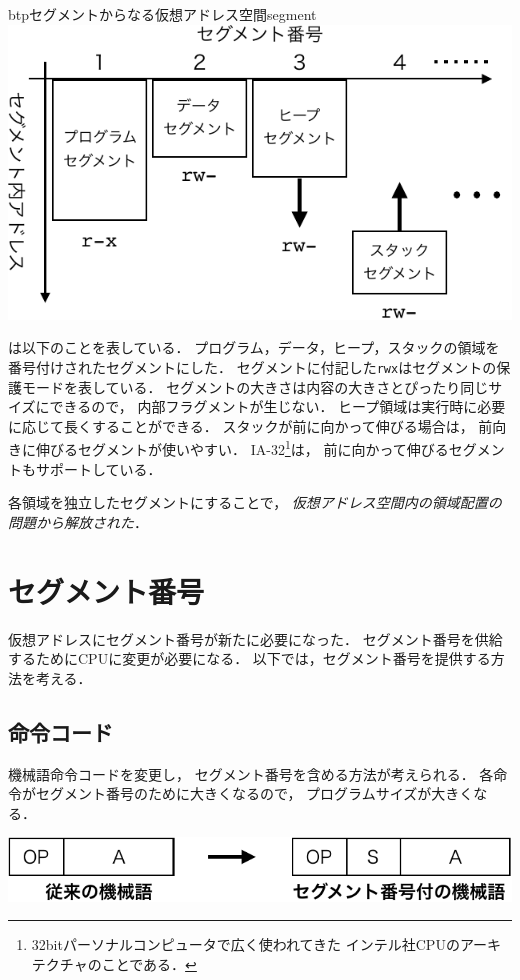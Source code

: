 \begin{myfig}{btp}{セグメントからなる仮想アドレス空間}{segment}
  \includegraphics[scale=0.88]{Fig/segment-crop.pdf}
\end{myfig}

は以下のことを表している．
プログラム，データ，ヒープ，スタックの領域を番号付けされたセグメントにした．
セグメントに付記した\texttt{rwx}はセグメントの保護モードを表している．
セグメントの大きさは内容の大きさとぴったり同じサイズにできるので，
内部フラグメントが生じない．
ヒープ領域は実行時に必要に応じて長くすることができる．
スタックが前に向かって伸びる場合は，
前向きに伸びるセグメントが使いやすい．
IA-32\footnote{
  32bitパーソナルコンピュータで広く使われてきた
  インテル社CPUのアーキテクチャのことである．}は，
前に向かって伸びるセグメントもサポートしている\cite{ia32Segmentation}．

各領域を独立したセグメントにすることで，
\emph{仮想アドレス空間内の領域配置の問題から解放された}．

\section{セグメント番号}
仮想アドレスにセグメント番号が新たに必要になった．
セグメント番号を供給するためにCPUに変更が必要になる．
以下では，セグメント番号を提供する方法を考える．

\subsection{命令コード}
機械語命令コードを変更し，
セグメント番号を含める方法が考えられる．
各命令がセグメント番号のために大きくなるので，
プログラムサイズが大きくなる．
\begin{center}
  \includegraphics[scale=0.77]{Fig/segmentationInstruction-crop.pdf}
\end{center}

